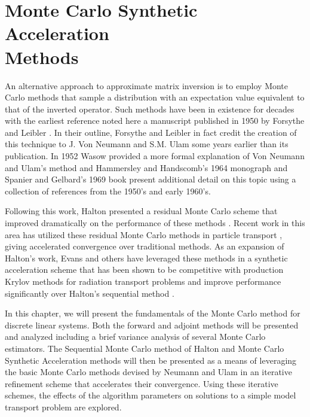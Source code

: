 \chapter{Monte Carlo Synthetic Acceleration\\ Methods}
\label{ch:stochastic_methods}
An alternative approach to approximate matrix inversion is to employ
Monte Carlo methods that sample a distribution with an expectation
value equivalent to that of the inverted operator. Such methods have
been in existence for decades with the earliest reference noted here a
manuscript published in 1950 by Forsythe and Leibler
\cite{forsythe_matrix_1950}. In their outline, Forsythe and Leibler
in fact credit the creation of this technique to J. Von Neumann and
S.M. Ulam some years earlier than its publication. In 1952 Wasow
provided a more formal explanation of Von Neumann and Ulam's method
\cite{wasow_note_1952} and Hammersley and Handscomb's 1964 monograph
\cite{hammersley_monte_1964} and Spanier and Gelbard's 1969 book
\cite{spanier_monte_1969} present additional detail on this topic
using a collection of references from the 1950's and early
1960's. 

Following this work, Halton presented a residual Monte Carlo scheme
that improved dramatically on the performance of these methods
\cite{halton_sequential_1962}. Recent work in this area has utilized
these residual Monte Carlo methods in particle transport
\cite{evans_residual_2003}, giving accelerated convergence over
traditional methods. As an expansion of Halton's work, Evans and
others have leveraged these methods in a synthetic acceleration scheme
that has been shown to be competitive with production Krylov methods
for radiation transport problems and improve performance significantly
over Halton's sequential method \cite{evans_monte_2012}.

In this chapter, we will present the fundamentals of the Monte Carlo
method for discrete linear systems. Both the forward and adjoint
methods will be presented and analyzed including a brief variance
analysis of several Monte Carlo estimators. The Sequential Monte Carlo
method of Halton and Monte Carlo Synthetic Acceleration methods will
then be presented as a means of leveraging the basic Monte Carlo
methods devised by Neumann and Ulam in an iterative refinement scheme
that accelerates their convergence. Using these iterative schemes,
the effects of the algorithm parameters on solutions to a simple model
transport problem are explored.

